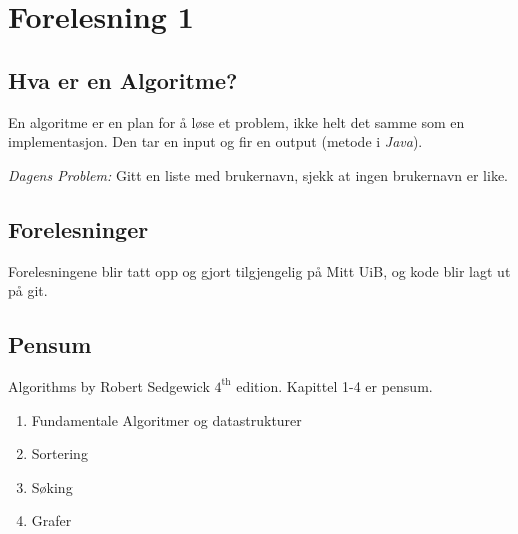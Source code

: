 \documentclass{article}
\begin{document}
\section{Forelesning 1}

\subsection{Hva er en Algoritme?}

En algoritme er en plan for å løse et problem, ikke helt det samme som en implementasjon. Den tar en input og fir en output (metode i \textit{Java}).
\bigskip

\textit{Dagens Problem:} Gitt en liste med brukernavn, sjekk at ingen brukernavn er like.

\subsection{Forelesninger}
Forelesningene blir tatt opp og gjort tilgjengelig på Mitt UiB, og kode blir lagt ut på git.

\subsection{Pensum}
Algorithms by Robert Sedgewick \( 4^{\text{th}} \) edition. Kapittel 1-4 er pensum.

\begin{enumerate}
    \item Fundamentale Algoritmer og datastrukturer
    \item Sortering
    \item Søking
    \item Grafer
\end{enumerate}
\end{document}
